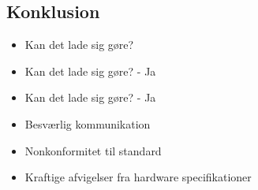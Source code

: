 \subsection{Konklusion}
\begin{frame}[fragile]{\insertsubsection}
  \begin{itemize}
    \item Kan det lade sig gøre?	
  \end{itemize}
\end{frame}

\begin{frame}[fragile]{\insertsubsection}
  \begin{itemize}
    \item Kan det lade sig gøre? - Ja
  \end{itemize}
\end{frame}

\begin{frame}[fragile]{\insertsubsection}
  \begin{itemize}
    \item Kan det lade sig gøre? - Ja
	\item Besværlig kommunikation
	\item Nonkonformitet til standard
	\item Kraftige afvigelser fra hardware specifikationer
  \end{itemize}
\end{frame}